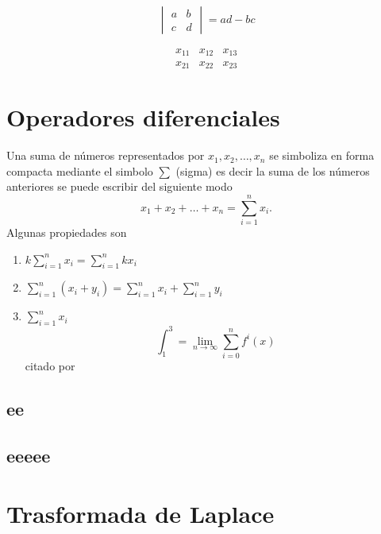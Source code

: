 \documentclass[10pt,]{krantz}
\providecommand{\tightlist}{%
  \setlength{\itemsep}{0pt}\setlength{\parskip}{0pt}}
\theoremstyle{definition}
\theoremstyle{definition}
\theoremstyle{definition}
\theoremstyle{remark}
\begin{document}
\[\begin{vmatrix}a & b\\
c & d
\end{vmatrix}=ad-bc\]

\[\begin{array}{ccc}
x_{11} & x_{12} & x_{13}\\
x_{21} & x_{22} & x_{23}
\end{array}\]

\hypertarget{appendix-apendice}{%
\appendix {}}


\hypertarget{operadores-diferenciales-1}{%
\chapter{Operadores diferenciales}\label{operadores-diferenciales-1}}

Una suma de números representados por \(x_1, x_2, \ldots, x_n\) se simboliza en forma compacta mediante el simbolo \(\sum\) (sigma) es decir la suma de los números anteriores se puede escribir del siguiente modo \[x_1+x_2+\dots+x_n=\sum_{i=1}^nx_i.\]
Algunas propiedades son

\begin{enumerate}
\def\labelenumi{\arabic{enumi}.}
\tightlist
\item
  \(k\sum_{i=1}^nx_i=\sum_{i=1}^nkx_i\)
\item
  \(\sum_{i=1}^n\left(x_i+y_i\right)=\sum_{i=1}^nx_i+\sum_{i=1}^ny_i\)
\item
  \(\sum_{i=1}^nx_i\)
  \[\int_1^3=\lim_{n\to \infty}\sum_{i=0}^{n}f^i(x)\]
  citado por \citep{xie2015}
\end{enumerate}

\hypertarget{ee}{%
\section{ee}\label{ee}}

\hypertarget{eeeee}{%
\section{eeeee}\label{eeeee}}

\hypertarget{trasformada-de-laplace}{%
\chapter{Trasformada de Laplace}\label{trasformada-de-laplace}}
\end{document}

